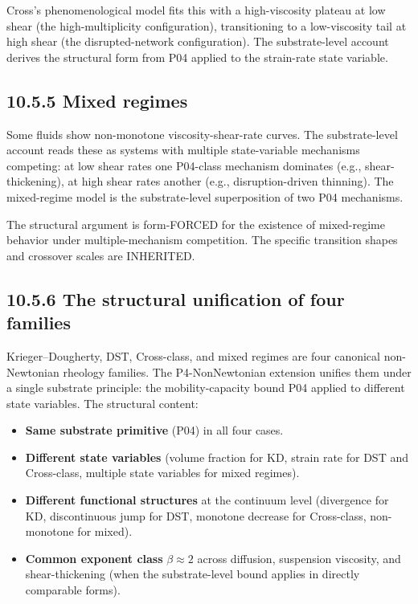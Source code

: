 \documentclass[11pt]{book}
\begin{document}
Cross's phenomenological model fits this with a high-viscosity plateau at low shear (the high-multiplicity configuration), transitioning to a low-viscosity tail at high shear (the disrupted-network configuration). The substrate-level account derives the structural form from P04 applied to the strain-rate state variable.

\subsection{10.5.5 Mixed regimes}

Some fluids show non-monotone viscosity-shear-rate curves. The substrate-level account reads these as systems with multiple state-variable mechanisms competing: at low shear rates one P04-class mechanism dominates (e.g., shear-thickening), at high shear rates another (e.g., disruption-driven thinning). The mixed-regime model is the substrate-level superposition of two P04 mechanisms.

The structural argument is form-FORCED for the existence of mixed-regime behavior under multiple-mechanism competition. The specific transition shapes and crossover scales are INHERITED.

\subsection{10.5.6 The structural unification of four families}

Krieger–Dougherty, DST, Cross-class, and mixed regimes are four canonical non-Newtonian rheology families. The P4-NonNewtonian extension unifies them under a single substrate principle: the mobility-capacity bound P04 applied to different state variables. The structural content:

\begin{itemize}
\item \textbf{Same substrate primitive} (P04) in all four cases.
\item \textbf{Different state variables} (volume fraction for KD, strain rate for DST and Cross-class, multiple state variables for mixed regimes).
\item \textbf{Different functional structures} at the continuum level (divergence for KD, discontinuous jump for DST, monotone decrease for Cross-class, non-monotone for mixed).
\item \textbf{Common exponent class} $\beta \approx 2$ across diffusion, suspension viscosity, and shear-thickening (when the substrate-level bound applies in directly comparable forms).
\end{itemize}
\end{document}
